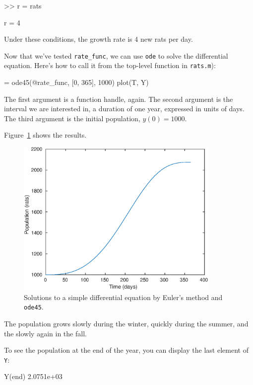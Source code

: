 \begin{code}
>> r = rats

r = 4
\end{code}

Under these conditions, the growth rate is 4 new rats per day. 

Now that we've tested \verb"rate_func", we can use {\tt ode} to solve the differential equation.
Here's how to call it from the top-level function in {\tt rats.m}):

\begin{code}
[T, Y] = ode45(@rate_func, [0, 365], 1000)
plot(T, Y)
\end{code}

The first argument is a function handle, again.  The second argument is the interval we are interested
in, a duration of one year, expressed in units of days.
The third argument is the initial population, $y(0) = 1000$.


Figure~\ref{fig:rats} shows the results. 

\begin{figure}[ht]
\centerline{\includegraphics[height=3in]{book/figs/rats.eps}}
\caption{Solutions to a simple differential equation by Euler's method and {\tt ode45}.}
\label{fig:rats}
\end{figure}

The population grows slowly during the winter, quickly during the summer, and the slowly again in the fall.


To see the population at the end of the year, you can display the last element of {\tt Y}:

\begin{code}
Y(end)
2.0751e+03
\end{code}

